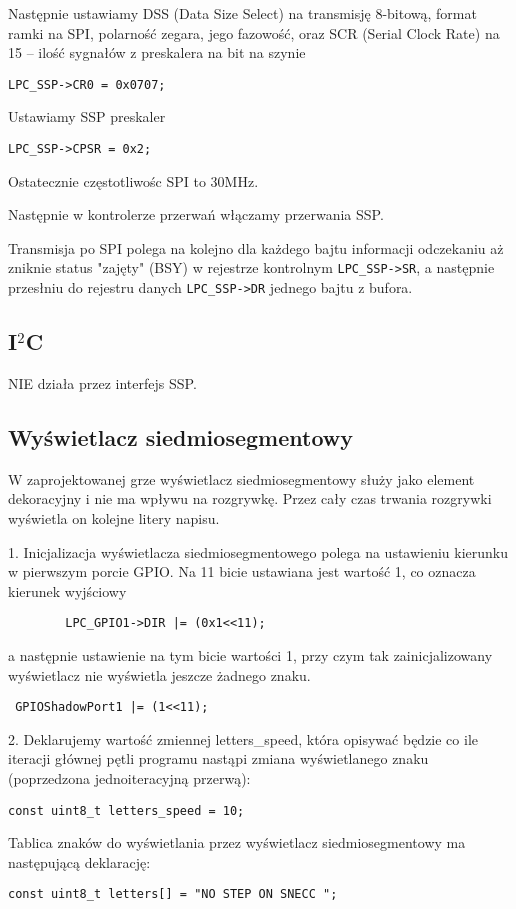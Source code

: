 \documentclass[a4paper,12pt,twoside]{article}
\theoremstyle{plain}
\theoremstyle{definition}
\theoremstyle{remark}
\begin{document}
Następnie ustawiamy DSS (Data Size Select) na transmisję 8-bitową, format ramki na SPI, polarność zegara, jego fazowość, oraz SCR (Serial Clock Rate) na 15 -- ilość sygnałów z preskalera na bit na szynie
\begin{verbatim}
LPC_SSP->CR0 = 0x0707;
\end{verbatim}

Ustawiamy SSP preskaler
\begin{verbatim}
LPC_SSP->CPSR = 0x2;
\end{verbatim}

Ostatecznie częstotliwośc SPI to 30MHz.

Następnie w kontrolerze przerwań włączamy przerwania SSP.

Transmisja po SPI polega na kolejno dla każdego bajtu informacji odczekaniu aż zniknie status "zajęty" (BSY) w rejestrze kontrolnym \verb|LPC_SSP->SR|,
a następnie przesłniu do rejestru danych \verb|LPC_SSP->DR| jednego bajtu z bufora. 


\subsection{I$^2$C}
NIE działa przez interfejs SSP.

\subsection{Wyświetlacz siedmiosegmentowy}
W zaprojektowanej grze wyświetlacz siedmiosegmentowy służy jako element dekoracyjny i nie ma wpływu na rozgrywkę. Przez cały czas trwania rozgrywki wyświetla on kolejne litery napisu.

1. Inicjalizacja wyświetlacza siedmiosegmentowego polega na ustawieniu kierunku w pierwszym porcie GPIO. Na 11 bicie ustawiana jest wartość 1, co oznacza kierunek wyjściowy
\begin{verbatim}
		LPC_GPIO1->DIR |= (0x1<<11);
\end{verbatim}
a następnie ustawienie na tym bicie wartości 1, przy czym tak zainicjalizowany wyświetlacz nie wyświetla jeszcze żadnego znaku.
\begin{verbatim}
 GPIOShadowPort1 |= (1<<11);
\end{verbatim}

2. Deklarujemy wartość zmiennej letters\_speed, która opisywać będzie co ile iteracji głównej pętli programu nastąpi zmiana wyświetlanego znaku (poprzedzona jednoiteracyjną przerwą):
\begin{verbatim}
const uint8_t letters_speed = 10;
\end{verbatim}
Tablica znaków do wyświetlania przez wyświetlacz siedmiosegmentowy ma następującą deklarację:
\begin{verbatim}
const uint8_t letters[] = "NO STEP ON SNECC ";
\end{verbatim}
\end{document}
